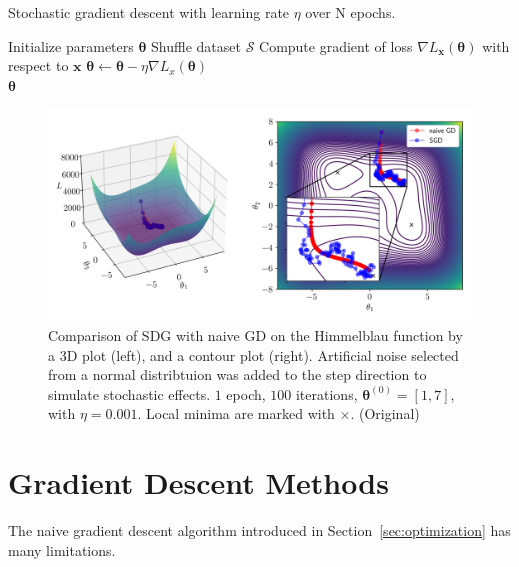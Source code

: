 \documentclass[12pt]{report}
\theoremstyle{definition}
\theoremstyle{remark}
\begin{document}
\begin{algorithm}
    \caption{Stochastic gradient descent with learning rate $\eta$ over N epochs.}\label{alg:sgd}
    \begin{algorithmic}[1]
        \State Initialize parameters $\boldsymbol{\theta}$
            \State Shuffle dataset $\mathcal{S}$
                \State Compute gradient of loss $\nabla L_\mathbf{x}(\boldsymbol{\theta})$ with respect to $\mathbf{x}$
                \State $\boldsymbol{\theta} \leftarrow \boldsymbol{\theta} - \eta \nabla L_x(\boldsymbol{\theta})$
            \EndFor
        \EndFor \\
        \Return $\boldsymbol{\theta}$
    \end{algorithmic}
\end{algorithm}
\begin{figure}[h]
    \centering
    \includegraphics[width=\linewidth]{figs/stochastic_comparison.png}
    \caption{Comparison of SDG with naive GD on the Himmelblau function by a 3D plot (left), and a contour plot (right). Artificial noise selected from a normal distribtuion was added to the step direction to simulate stochastic effects. $1$ epoch, $100$ iterations, $\boldsymbol{\theta}^{(0)} = [1,7]$, with $\eta = 0.001$. Local minima are marked with $\times$. (Original)}
    \label{fig:enter-label}
\end{figure}

\section{Gradient Descent Methods}\label{sec:gradient-descent-methods}

The naive gradient descent algorithm introduced in Section~\ref{sec:optimization} has many limitations.
\end{document}
